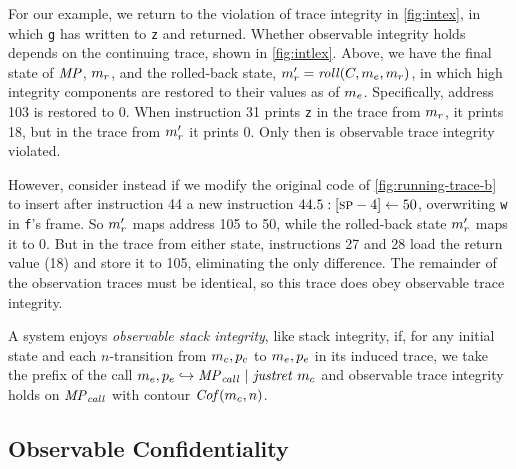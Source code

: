 \documentclass[acmsmall,review,anonymous]{acmart}\settopmatter{printfolios=true,printccs=false,printacmref=false}
\begin{document}

    For our example, we return to the violation of trace integrity in
    \cref{fig:intex}, in which {\tt g} has written to {\tt z} and returned.
    Whether observable integrity holds depends on the continuing trace, shown
    in \cref{fig:intlex}. Above, we have the final state of \(\mathit{MP}\),
    \(m_r\), and the rolled-back state, \(m_r' =
    \mathit{roll}(C,m_e,m_r)\), in which high integrity
    components are restored to their values as of \(m_e\). Specifically,
    address 103 is restored to 0. When instruction 31 prints {\tt z} in the
    trace from \(m_r\), it prints 18, but in the trace from \(m_r'\)
    it prints 0. Only then is observable trace integrity violated.

    However, consider instead if we modify the original code of \cref{fig:running-trace-b} to insert after instruction 44 a new
    instruction \(44.5: [\textsc{sp}-4] \leftarrow 50\), overwriting {\tt w} in
    {\tt f}'s frame. So \(m_r'\) maps address 105 to 50, while the
    rolled-back state \(m_r'\) maps it to 0. But in the trace from either
    state, instructions 27 and 28 load the return value (18) and store it to
    105, eliminating the only difference. The remainder of the observation
    traces must be identical, so this trace does obey observable trace
    integrity.


      A system enjoys {\em observable stack integrity}, like stack integrity,
      if, for any initial state and each \(n\)-transition from
      \(m_c,p_c\) to \(m_e,p_e\) in its
      induced trace, we take the prefix of the call
      \(m_e,p_e \hookrightarrow \mathit{MP}_{\mathit{call}} ~ | ~ \mathit{justret}\ m_c\)
      and observable trace integrity holds on \(\mathit{MP}_{\mathit{call}}\) with
      contour \(\mathit{Cof}(m_c,n)\).

  \subsection{Observable Confidentiality}
\end{document}
